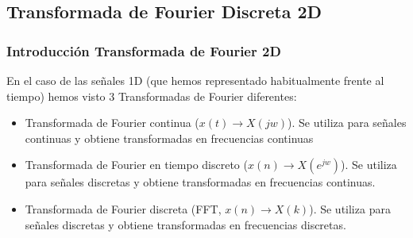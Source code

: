 \subsection{Transformada de Fourier Discreta 2D}

\begin{frame}
\frametitle{Introducci\'{o}n Transformada de Fourier 2D}

\small

En el caso de las se\~{n}ales 1D (que hemos representado habitualmente frente al tiempo) hemos visto 3 Transformadas de Fourier diferentes:
\begin{itemize}

\item Transformada de Fourier continua ($x(t) \rightarrow X(jw)$). Se utiliza para se\~{n}ales continuas y obtiene transformadas en frecuencias continuas

\item Transformada de Fourier en tiempo discreto ($x(n) \rightarrow X(e^{jw})$). Se utiliza para se\~{n}ales discretas y obtiene transformadas en frecuencias continuas.

\item Transformada de Fourier discreta (FFT, $x(n) \rightarrow X(k)$). Se utiliza para se\~{n}ales discretas y obtiene transformadas en frecuencias discretas.

\end{itemize}


\vspace{0.1cm}

\end{frame}
